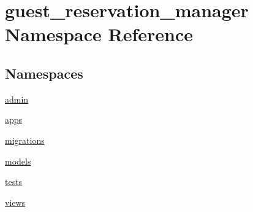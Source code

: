 \hypertarget{namespaceguest__reservation__manager}{\section{guest\-\_\-reservation\-\_\-manager Namespace Reference}
\label{namespaceguest__reservation__manager}
}
\subsection*{Namespaces}
\begin{DoxyCompactItemize}
\item 
\hyperlink{namespaceguest__reservation__manager_1_1admin}{admin}
\item 
\hyperlink{namespaceguest__reservation__manager_1_1apps}{apps}
\item 
\hyperlink{namespaceguest__reservation__manager_1_1migrations}{migrations}
\item 
\hyperlink{namespaceguest__reservation__manager_1_1models}{models}
\item 
\hyperlink{namespaceguest__reservation__manager_1_1tests}{tests}
\item 
\hyperlink{namespaceguest__reservation__manager_1_1views}{views}
\end{DoxyCompactItemize}
